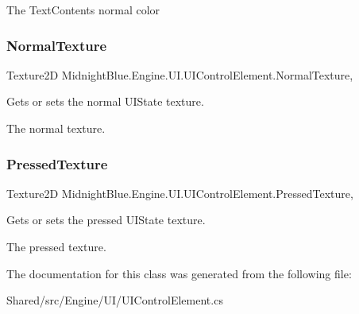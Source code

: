 The Text\+Contents normal color\hypertarget{class_midnight_blue_1_1_engine_1_1_u_i_1_1_u_i_control_element_aeb74d6760c269f3aa3ace852d4856de1}{}\label{class_midnight_blue_1_1_engine_1_1_u_i_1_1_u_i_control_element_aeb74d6760c269f3aa3ace852d4856de1} 
\subsubsection{\texorpdfstring{Normal\+Texture}{NormalTexture}}
{\footnotesize\ttfamily Texture2D Midnight\+Blue.\+Engine.\+U\+I.\+U\+I\+Control\+Element.\+Normal\+Texture\hspace{0.3cm}{\ttfamily [get]}, {\ttfamily [set]}}



Gets or sets the normal U\+I\+State texture. 

The normal texture.\hypertarget{class_midnight_blue_1_1_engine_1_1_u_i_1_1_u_i_control_element_ace671a25fddbf14032e1ce7867a2022c}{}\label{class_midnight_blue_1_1_engine_1_1_u_i_1_1_u_i_control_element_ace671a25fddbf14032e1ce7867a2022c} 
\subsubsection{\texorpdfstring{Pressed\+Texture}{PressedTexture}}
{\footnotesize\ttfamily Texture2D Midnight\+Blue.\+Engine.\+U\+I.\+U\+I\+Control\+Element.\+Pressed\+Texture\hspace{0.3cm}{\ttfamily [get]}, {\ttfamily [set]}}



Gets or sets the pressed U\+I\+State texture. 

The pressed texture.

The documentation for this class was generated from the following file\+:\begin{DoxyCompactItemize}
\item 
Shared/src/\+Engine/\+U\+I/U\+I\+Control\+Element.\+cs\end{DoxyCompactItemize}
